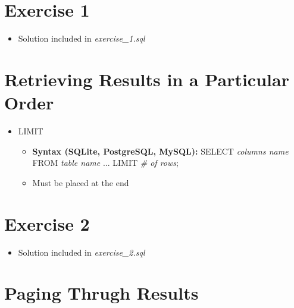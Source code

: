 \documentclass[12pt]{article}
\begin{document}
\bigskip

\section{Exercise 1}

\bigskip

\begin{itemize}
    \item Solution included in \textit{exercise\_1.sql}
\end{itemize}

\bigskip

\section{Retrieving Results in a Particular Order}

\bigskip

\begin{itemize}
    \item LIMIT
    \begin{itemize}
        \item \textbf{Syntax (SQLite, PostgreSQL, MySQL):} SELECT \textit{columns name} FROM \textit{table name} ... LIMIT \textit{\# of rows};
        \item Must be placed at the end
    \end{itemize}
\end{itemize}

\bigskip

\section{Exercise 2}

\bigskip

\begin{itemize}
    \item Solution included in \textit{exercise\_2.sql}
\end{itemize}

\bigskip

\section{Paging Thrugh Results}

\bigskip
\end{document}
